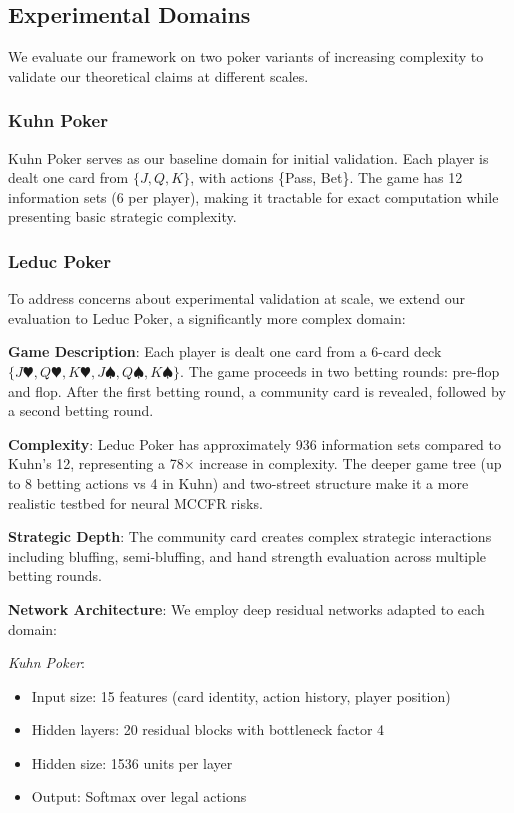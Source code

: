 \documentclass[12pt,a4paper]{article}
\begin{document}
\subsection{Experimental Domains}

We evaluate our framework on two poker variants of increasing complexity to validate our theoretical claims at different scales.

\subsubsection{Kuhn Poker}

Kuhn Poker serves as our baseline domain for initial validation. Each player is dealt one card from $\{J, Q, K\}$, with actions \{Pass, Bet\}. The game has 12 information sets (6 per player), making it tractable for exact computation while presenting basic strategic complexity.

\subsubsection{Leduc Poker}

To address concerns about experimental validation at scale, we extend our evaluation to Leduc Poker, a significantly more complex domain:

\textbf{Game Description}: Each player is dealt one card from a 6-card deck $\{J♥, Q♥, K♥, J♠, Q♠, K♠\}$. The game proceeds in two betting rounds: pre-flop and flop. After the first betting round, a community card is revealed, followed by a second betting round.

\textbf{Complexity}: Leduc Poker has approximately 936 information sets compared to Kuhn's 12, representing a 78× increase in complexity. The deeper game tree (up to 8 betting actions vs 4 in Kuhn) and two-street structure make it a more realistic testbed for neural MCCFR risks.

\textbf{Strategic Depth}: The community card creates complex strategic interactions including bluffing, semi-bluffing, and hand strength evaluation across multiple betting rounds.

\textbf{Network Architecture}: We employ deep residual networks adapted to each domain:

\textit{Kuhn Poker}:
\begin{itemize}
\item Input size: 15 features (card identity, action history, player position)
\item Hidden layers: 20 residual blocks with bottleneck factor 4
\item Hidden size: 1536 units per layer
\item Output: Softmax over legal actions
\end{itemize}
\end{document}
